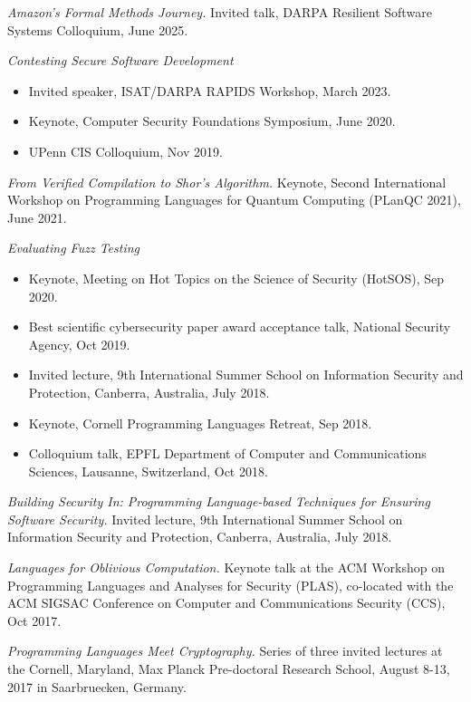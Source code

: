 \documentclass[11pt]{article}
\begin{document}
\begin{description}
    \item \textit{Amazon's Formal Methods Journey.} Invited talk, DARPA Resilient Software Systems Colloquium, June 2025.
    \item
      \textit{Contesting Secure Software Development}
      \begin{itemize}
        \item Invited speaker, ISAT/DARPA RAPIDS Workshop, March 2023.
        \item Keynote, Computer Security Foundations Symposium, June
          2020.
         \item UPenn CIS Colloquium, Nov 2019.
          \end{itemize}
\item 
        \textit{From Verified Compilation to Shor's Algorithm.} Keynote, Second International Workshop on Programming Languages for Quantum Computing (PLanQC 2021), June 2021.
    \item
        \textit{Evaluating Fuzz Testing}
        \begin{itemize}
            \item Keynote, Meeting on Hot Topics on the Science of Security (HotSOS), Sep 2020.
            \item
                Best scientific cybersecurity paper award acceptance talk, National Security Agency, Oct 2019.
            \item
                Invited lecture, 9th International Summer School on Information Security and Protection, Canberra, Australia, July 2018. 
            \item
                Keynote, Cornell Programming Languages Retreat, Sep 2018. 
             \item
                Colloquium talk, EPFL Department of Computer and Communications Sciences, Lausanne, Switzerland, Oct 2018.
        \end{itemize}
    \item
        \textit{Building Security In: Programming Language-based Techniques for Ensuring Software Security.} Invited lecture, 9th International Summer School on Information Security and Protection, Canberra, Australia, July 2018.
    \item
        \textit{Languages for Oblivious Computation.} Keynote talk at the ACM Workshop on Programming Languages and Analyses for Security (PLAS), co-located with the ACM SIGSAC Conference on Computer and Communications Security (CCS), Oct 2017. 
    \item
        \textit{Programming Languages Meet Cryptography.} Series of three invited lectures at the Cornell, Maryland, Max Planck Pre-doctoral Research School, August 8-13, 2017 in Saarbruecken, Germany. 

\end{description}
\end{document}
